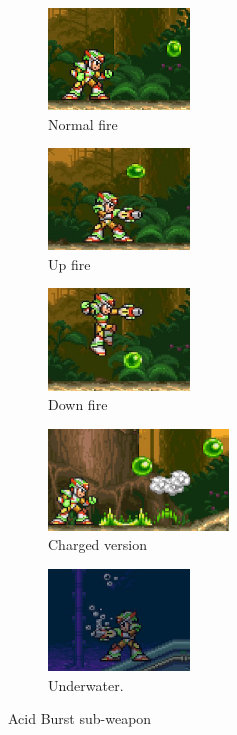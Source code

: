 \begin{figure}[htp]
	\centering
	\begin{subfigure}{3.9cm}
		\includegraphics[height=2.7cm]{figures/X3/weapons/A_burst.png}
		\caption{Normal fire}	
	\end{subfigure}
	\begin{subfigure}{3.9cm}
		\includegraphics[height=2.7cm]{figures/X3/weapons/A_burst_up.png}	
		\caption{Up fire}
	\end{subfigure}
	\begin{subfigure}{3.9cm}
		\includegraphics[height=2.7cm]{figures/X3/weapons/A_burst_Down.png}	
		\caption{Down fire}
	\end{subfigure}
	\begin{subfigure}{0.4\linewidth}
		\centering
		\includegraphics[height=2.7cm]{figures/X3/weapons/A_burst_charge.png}
		\caption{Charged version}	
	\end{subfigure}
	\begin{subfigure}{0.4\linewidth}
		\centering
		\includegraphics[height=2.7cm]{figures/X3/weapons/A_burst_water.png}
		\caption{Underwater.}
	\end{subfigure}
	\caption{Acid Burst sub-weapon}
\end{figure}


